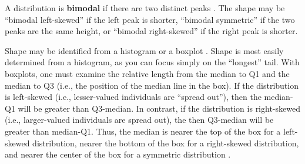 A distribution is \textbf{bimodal} if there are two distinct peaks . The shape may be ``bimodal left-skewed'' if the left peak is shorter, ``bimodal symmetric'' if the two peaks are the same height, or ``bimodal right-skewed'' if the right peak is shorter.

\begin{knitrout}
\color{fgcolor}\begin{kframe}


{\ttfamily\noindent\bfseries{}}\end{kframe}
\end{knitrout}

Shape may be identified from a histogram or a boxplot . Shape is most easily determined from a histogram, as you can focus simply on the ``longest'' tail. With boxplots, one must examine the relative length from the median to Q1 and the median to Q3 (i.e., the position of the median line in the box). If the distribution is left-skewed (i.e., lesser-valued individuals are ``spread out''), then the median-Q1 will be greater than Q3-median. In contrast, if the distribution is right-skewed (i.e., larger-valued individuals are spread out), the then Q3-median will be greater than median-Q1. Thus, the median is nearer the top of the box for a left-skewed distribution, nearer the bottom of the box for a right-skewed distribution, and nearer the center of the box for a symmetric distribution .

\begin{knitrout}
\color{fgcolor}\begin{kframe}


{\ttfamily\noindent\bfseries{}}

{\ttfamily\noindent\bfseries{}}

{\ttfamily\noindent\bfseries{}}

{\ttfamily\noindent\bfseries\color{errorcolor}{\#\# Error in eval(expr, envir, enclos): object 'h' not found}}\end{kframe}
\end{knitrout}

